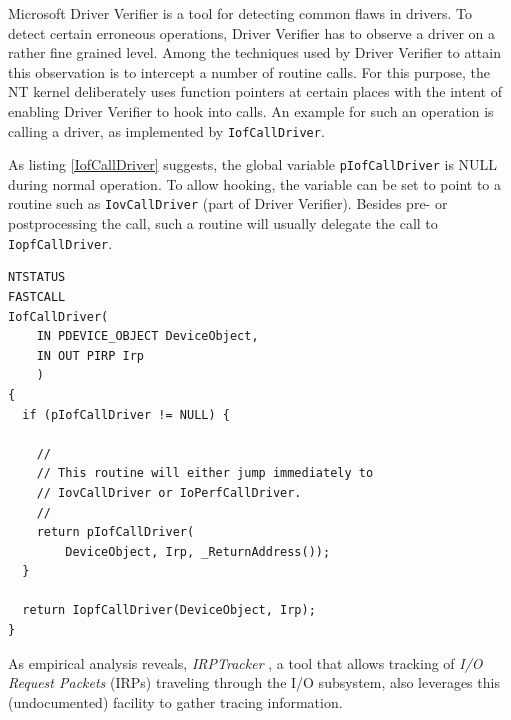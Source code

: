 Microsoft Driver Verifier is a tool for detecting common flaws in drivers. To detect
certain erroneous operations, Driver Verifier has to observe a driver on a rather
fine grained level. Among the techniques used by Driver Verifier to attain this 
observation is to intercept a number of routine calls. For this purpose, the NT kernel 
deliberately uses function pointers at certain places with the intent of enabling 
Driver Verifier to hook into calls. An example for such an operation
is calling a driver, as implemented by \verb|IofCallDriver|.

As listing \ref{IofCallDriver} suggests, the global variable \verb|pIofCallDriver| is NULL
during normal operation. To allow hooking, the variable can be set to 
point to a routine such as \verb|IovCallDriver| (part of Driver Verifier).
Besides pre- or postprocessing the call, such a routine will usually 
delegate the call to \verb|IopfCallDriver|.


\begin{lstlisting}[label={IofCallDriver}, caption={Implementation of IofCallDriver, WRK 1.2, \\ BASE$\backslash$NTOS$\backslash$IO$\backslash$IOMGR$\backslash$iosubs.c, line 2237}]
NTSTATUS
FASTCALL
IofCallDriver(
    IN PDEVICE_OBJECT DeviceObject,
    IN OUT PIRP Irp
    )
{
  if (pIofCallDriver != NULL) {

    //
    // This routine will either jump immediately to  
    // IovCallDriver or IoPerfCallDriver.
    //
    return pIofCallDriver(
	    DeviceObject, Irp, _ReturnAddress());
  }

  return IopfCallDriver(DeviceObject, Irp);
}
\end{lstlisting}



As empirical analysis reveals, \emph{IRPTracker} \cite{NtInsider03}, a tool that allows
tracking of \emph{I/O Request Packets} (IRPs) traveling through the I/O subsystem, also leverages this (undocumented)
facility to gather tracing information.



